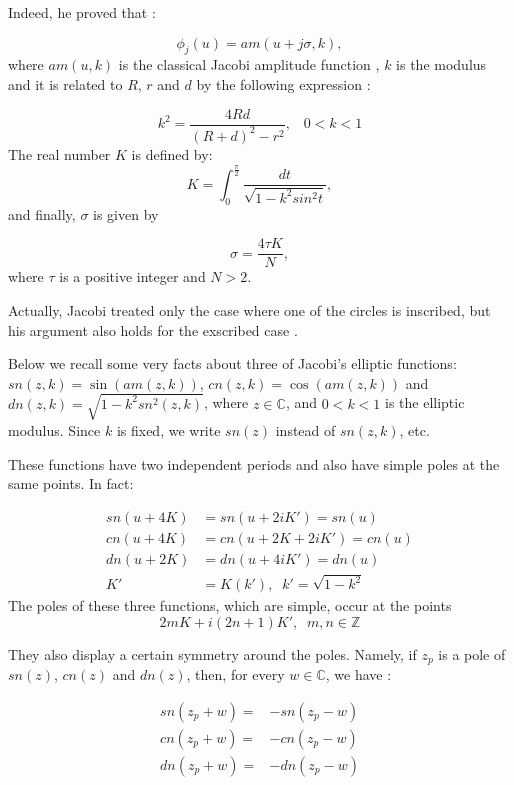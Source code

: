 Indeed, he proved that \cite{bos-1987}:

\begin{equation}
\label{jacobiangle}
\phi_{j}(u)=am(u+ j \sigma,k),
\end{equation}
%
where $am(u,k)$ is the classical Jacobi amplitude function \cite{armitage-2006}, $k$ is the modulus and it is related to $R$, $r$ and $d$ by the following expression \cite[pp. 315]{bos-1987}:

\begin{equation}
\label{jacobirelation}
k^2=\frac{4Rd}{(R+d)^2-r^2},\;\;\;0<k<1
\end{equation}
The real number $K$ is defined by:
%
\[K=\int_{0}^{\frac{\pi}{2}} \frac{dt}{\sqrt{1-k^2sin^2{t}}}, \]
and finally, $\sigma$ is given by

\[ \sigma=\frac{4\tau K}{N},\]
where $\tau$ is a positive integer and $N>2$.

Actually, Jacobi treated only the case where one of the circles is inscribed, but his argument also holds for the exscribed case \cite{bos-1987}.

Below we recall some very facts about three of Jacobi's elliptic functions: $sn(z,k)=\sin{(am(z,k))}$, $cn(z,k)=\cos(am(z,k))$ and $dn(z,k)=\sqrt{1-k^2sn^2(z,k)}$, where $z \in \mathbb{C}$, and $0<k<1$ is the elliptic modulus. Since $k$ is fixed, we write $sn(z)$ instead of $sn(z,k)$, etc.

These functions have two independent periods and also have simple poles at the same points. In fact:

\begin{align*}
    sn(u+4K)&=sn(u+2iK')=sn(u)\\
    cn(u+4K)&=cn(u+2K+2iK')=cn(u)\\
    dn(u+2K)&=dn(u+4iK')=dn(u)\\
    K'&=K(k'), \;\;k'=\sqrt{1-k^2}
\end{align*}
The  poles of these three functions, which are simple, occur at the points
\[2mK+i(2n+1)K'
,\;\; m,n\in \mathbb{Z}\]

They also display a certain symmetry around the poles. Namely, if $z_p$ is a pole of $sn(z)$, $cn(z)$ and $dn(z)$, then, for every $w \in \mathbb{C}$, we have \cite[Chapter 2]{armitage-2006}:

\begin{align}
sn(z_p+w)=&-sn(z_p-w) \nonumber \\
cn(z_p+w)=&-cn(z_p-w)  \label{eqn:zpole} \\
dn(z_p+w)=&-dn(z_p-w) \nonumber
\end{align}

 